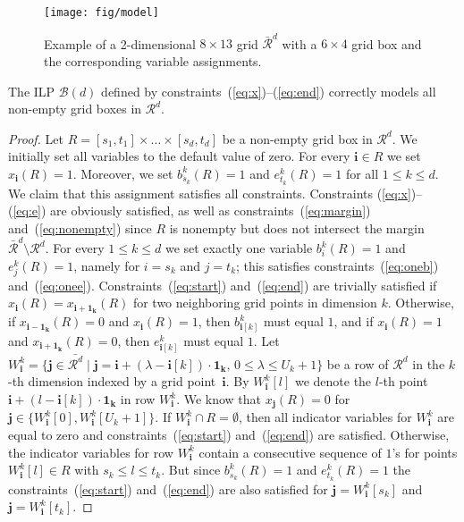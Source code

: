 \documentclass[runningheads]{llncs}
\newcommand{\bvec}[1]{\mathbf{#1}}
\newcounter{constr}
\begin{document}
\begin{figure}[tb]
	\centering
		\texttt{[image: fig/model]}
	\caption{\small Example of a 2-dimensional $8\times 13$ grid
$\bar{\mathcal R}^d$ with a 
	$6\times 4$ grid box and the corresponding variable assignments.}
	\label{fig:example2d}
	\vspace{-2ex}
\end{figure}


\newcommand{\lemboxtext}{The ILP $\mathcal B(d)$ defined by constraints~(\ref{eq:x})--(\ref{eq:end}) correctly models all non-empty grid boxes in $\mathcal R^d$.
}

\begin{lemma}\label{lem:correctbox}
\lemboxtext
\end{lemma}

\begin{proof}
  Let $R = [s_1,t_1] \times \ldots \times [s_d, t_d]$ be a non-empty
grid box in $\mathcal R^d$. We initially set all variables to the
default value of zero. For every $\bvec{i} \in R$ we set
$x_\bvec{i}(R) = 1$. Moreover, we set $b_{s_k}^k(R) = 1$ and
$e_{t_k}^k(R) = 1$ for all $1 \le k \le d$. We claim that this
assignment satisfies all constraints. Constraints
(\ref{eq:x})--(\ref{eq:e}) are obviously satisfied, as well as 
constraints~(\ref{eq:margin}) and~(\ref{eq:nonempty}) since $R$ is
nonempty but does not intersect the margin $\bar{\mathcal R}^d
\setminus \mathcal R^d$. For every $1 \le k \le d$ we set exactly one
variable $b_i^k(R) = 1$ and $e_j^k(R)=1$, namely for $i=s_k$ and
$j=t_k$; this satisfies constraints~(\ref{eq:oneb})
and~(\ref{eq:onee}). Constraints~(\ref{eq:start}) and~(\ref{eq:end})
are trivially satisfied if $x_\bvec{i}(R) = x_\bvec{i+1_k}(R)$  for
two neighboring grid points in dimension $k$. Otherwise, if
$x_\bvec{i-1_k}(R) = 0$ and $x_\bvec{i}(R) = 1$, then
$b_{\bvec{i}[k]}^k$ must equal $1$, and if $x_\bvec{i}(R) = 1$ and
$x_\bvec{i+1_k}(R) = 0$, then $e_{\bvec{i}[k]}^k$ must equal $1$.
  Let $W_\bvec{i}^k = \{\bvec{j} \in \bar{\mathcal R^d} \mid \bvec{j}
= \bvec{i} + (\lambda - \bvec{i}[k]) \cdot \bvec{1_k}, \, 0 \le
\lambda \le U_k+1  \}$ be a row of $\mathcal R^d$ in the $k$-th
dimension indexed by a grid point~$\bvec{i}$. By $W_\bvec{i}^k[l]$ we
denote the $l$-th point $\bvec{i} + (l - \bvec{i}[k]) \cdot
\bvec{1_k}$ in row $W_\bvec{i}^k$. We know that   $x_\bvec{j}(R)=0$
for $\bvec{j} \in \{W_\bvec{i}^k[0], W_\bvec{i}^k[U_k+1]\}$. If
$W_\bvec{i}^k \cap R = \emptyset$, then all indicator variables for
$W_\bvec{i}^k$ are equal to zero and constraints~(\ref{eq:start})
and~(\ref{eq:end}) are satisfied. Otherwise, the indicator variables
for row $W_\bvec{i}^k$ contain a consecutive sequence of $1$'s for
points $W_\bvec{i}^k[l] \in R$ with $s_k \le l \le t_k$. But since
$b_{s_k}^k(R) = 1$ and $e_{t_k}^k(R) = 1$ the
constraints~(\ref{eq:start}) and~(\ref{eq:end}) are also satisfied for
$\bvec{j} = W_\bvec{i}^k[s_k]$ and $\bvec{j} = W_\bvec{i}^k[t_k]$.


\end{proof}
\end{document}
